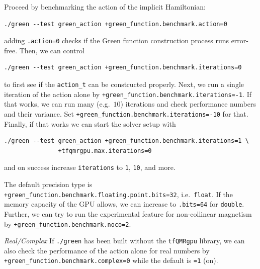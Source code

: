 \documentclass[oribibl]{llncs}
\newcommand{\ttt}[1]{\texttt{#1}}
\begin{document}
%
\noindent
Proceed by benchmarking the action of the implicit Hamiltonian:
\begin{verbatim}
./green --test green_action +green_function.benchmark.action=0
\end{verbatim}
adding \ttt{.action=0} checks if the Green function construction process runs error-free.
Then, we can control 
\begin{verbatim}
./green --test green_action +green_function.benchmark.iterations=0
\end{verbatim}
to first see if the \ttt{action\_t} can be constructed properly.
Next, we run a single iteration of the action alone by \ttt{+green\_function.benchmark.iterations=-1}.
If that works, we can run many (e.g.~$10$) iterations and check performance numbers and their variance.
Set \ttt{+green\_function.benchmark.iterations=-10} for that.
\noindent
Finally, if that works we can start the solver setup with 
\begin{verbatim}
./green --test green_action +green_function.benchmark.iterations=1 \
			   +tfqmrgpu.max.iterations=0
\end{verbatim}
and on success increase \ttt{iterations} to \ttt{1}, \ttt{10}, and more.

%
\noindent
The default precision type is \ttt{+green\_function.benchmark.floating.point.bits=32}, i.e.~\ttt{float}.
If the memory capacity of the \ac{GPU} allows, we can increase to \ttt{.bits=64} for \ttt{double}.
Further, we can try to run the experimental feature for non-collinear magnetism by \ttt{+green\_function.benchmark.noco=2}.
\todo[inline]{HC SVNT DRACONES}

%
\noindent
\emph{Real/Complex} If \ttt{./green} has been built without the \ttt{tfQMRgpu} library,
we can also check the performance of the action alone for real numbers by \ttt{+green\_function.benchmark.complex=0} 
while the default is \ttt{=1} (on).
\end{document}
